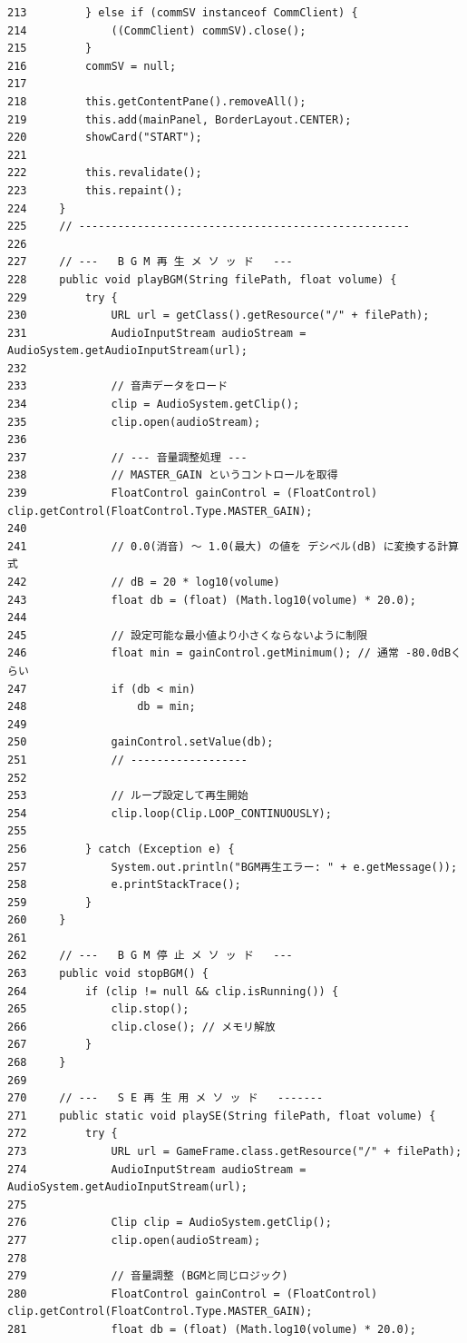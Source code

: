\documentclass[11pt,a4j]{jarticle}
\begin{document}
\begin{small}
\begin{verbatim}
213         } else if (commSV instanceof CommClient) {
214             ((CommClient) commSV).close();
215         }
216         commSV = null;
217 
218         this.getContentPane().removeAll();
219         this.add(mainPanel, BorderLayout.CENTER);
220         showCard("START");
221 
222         this.revalidate();
223         this.repaint();
224     }
225     // ---------------------------------------------------
226 
227     // ---   B G M 再 生 メ ソ ッ ド   ---
228     public void playBGM(String filePath, float volume) {
229         try {
230             URL url = getClass().getResource("/" + filePath);
231             AudioInputStream audioStream = AudioSystem.getAudioInputStream(url);
232 
233             // 音声データをロード
234             clip = AudioSystem.getClip();
235             clip.open(audioStream);
236 
237             // --- 音量調整処理 ---
238             // MASTER_GAIN というコントロールを取得
239             FloatControl gainControl = (FloatControl) clip.getControl(FloatControl.Type.MASTER_GAIN);
240 
241             // 0.0(消音) ～ 1.0(最大) の値を デシベル(dB) に変換する計算式
242             // dB = 20 * log10(volume)
243             float db = (float) (Math.log10(volume) * 20.0);
244 
245             // 設定可能な最小値より小さくならないように制限
246             float min = gainControl.getMinimum(); // 通常 -80.0dBくらい
247             if (db < min)
248                 db = min;
249 
250             gainControl.setValue(db);
251             // ------------------
252 
253             // ループ設定して再生開始
254             clip.loop(Clip.LOOP_CONTINUOUSLY);
255 
256         } catch (Exception e) {
257             System.out.println("BGM再生エラー: " + e.getMessage());
258             e.printStackTrace();
259         }
260     }
261 
262     // ---   B G M 停 止 メ ソ ッ ド   ---
263     public void stopBGM() {
264         if (clip != null && clip.isRunning()) {
265             clip.stop();
266             clip.close(); // メモリ解放
267         }
268     }
269 
270     // ---   S E 再 生 用 メ ソ ッ ド   -------
271     public static void playSE(String filePath, float volume) {
272         try {
273             URL url = GameFrame.class.getResource("/" + filePath);
274             AudioInputStream audioStream = AudioSystem.getAudioInputStream(url);
275 
276             Clip clip = AudioSystem.getClip();
277             clip.open(audioStream);
278 
279             // 音量調整 (BGMと同じロジック)
280             FloatControl gainControl = (FloatControl) clip.getControl(FloatControl.Type.MASTER_GAIN);
281             float db = (float) (Math.log10(volume) * 20.0);

\end{verbatim}
\end{small}
\end{document}

